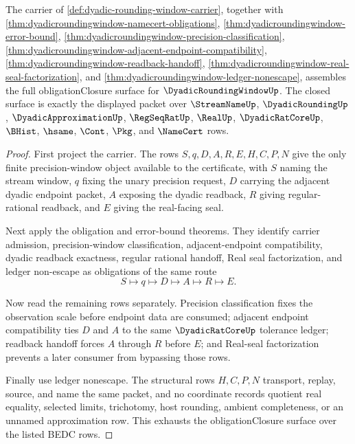 \begin{theorem}
\label{thm:dyadicroundingwindow-obligation-closure-package}
The carrier of \autoref{def:dyadic-rounding-window-carrier}, together with \autoref{thm:dyadicroundingwindow-namecert-obligations}, \autoref{thm:dyadicroundingwindow-error-bound}, \autoref{thm:dyadicroundingwindow-precision-classification}, \autoref{thm:dyadicroundingwindow-adjacent-endpoint-compatibility}, \autoref{thm:dyadicroundingwindow-readback-handoff}, \autoref{thm:dyadicroundingwindow-real-seal-factorization}, and \autoref{thm:dyadicroundingwindow-ledger-nonescape}, assembles the full obligationClosure surface for $\DyadicRoundingWindowUp$. The closed surface is exactly the displayed packet over $\StreamNameUp$, $\DyadicRoundingUp$, $\DyadicApproximationUp$, $\RegSeqRatUp$, $\RealUp$, $\DyadicRatCoreUp$, $\BHist$, $\hsame$, $\Cont$, $\Pkg$, and $\NameCert$ rows.
\end{theorem}
\begin{proof}
First project the carrier. The rows $S,q,D,A,R,E,H,C,P,N$ give the only finite precision-window object available to the certificate, with $S$ naming the stream window, $q$ fixing the unary precision request, $D$ carrying the adjacent dyadic endpoint packet, $A$ exposing the dyadic readback, $R$ giving regular-rational readback, and $E$ giving the real-facing seal.

Next apply the obligation and error-bound theorems. They identify carrier admission, precision-window classification, adjacent-endpoint compatibility, dyadic readback exactness, regular rational handoff, Real seal factorization, and ledger non-escape as obligations of the same route
$$
S\longmapsto q\longmapsto D\longmapsto A\longmapsto R\longmapsto E .
$$

Now read the remaining rows separately. Precision classification fixes the observation scale before endpoint data are consumed; adjacent endpoint compatibility ties $D$ and $A$ to the same $\DyadicRatCoreUp$ tolerance ledger; readback handoff forces $A$ through $R$ before $E$; and Real-seal factorization prevents a later consumer from bypassing those rows.

Finally use ledger nonescape. The structural rows $H,C,P,N$ transport, replay, source, and name the same packet, and no coordinate records quotient real equality, selected limits, trichotomy, host rounding, ambient completeness, or an unnamed approximation row. This exhausts the obligationClosure surface over the listed BEDC rows.
\end{proof}

